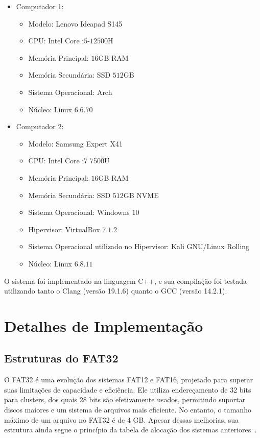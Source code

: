 \documentclass[
    12pt,				%
    oneside,   	        %
    a4paper,			%
    english,			%
    french,				%
    spanish,			%
    brazil,				%
    ]{pacotes/abntex2}
\begin{document}
\begin{itemize}
  \item Computador 1:
  \begin{itemize}
    \item Modelo: Lenovo Ideapad S145
    \item CPU: Intel Core i$5$-$12500$H
    \item Memória Principal: $16$GB RAM
    \item Memória Secundária: SSD $512$GB
    \item Sistema Operacional: Arch
  \item Núcleo: Linux $6.6.70$ 
  \end{itemize}
  \item Computador 2:
  \begin{itemize}
    \item Modelo: Samsung Expert X41
    \item CPU: Intel Core i7 7500U
    \item Memória Principal: $16$GB RAM
    \item Memória Secundária: SSD $512$GB NVME
    \item Sistema Operacional: Windowns $10$
    \item Hipervisor: VirtualBox $7.1.2$
    \item Sistema Operacional utilizado no Hipervisor: Kali GNU/Linux Rolling
    \item Núcleo: Linux $6.8.11$
  \end{itemize}
\end{itemize}

O sistema foi implementado na linguagem C++, e sua compilação foi testada utilizando tanto o Clang (versão 19.1.6) quanto o GCC (versão 14.2.1).

\section{Detalhes de Implementação}
\label{sec:implementacao}

\subsection{Estruturas do FAT32}
\label{subsec:estrutura_fat}

O FAT32 é uma evolução dos sistemas FAT12 e FAT16, projetado para superar suas limitações de capacidade e eficiência. Ele utiliza endereçamento de 32 bits para clusters, dos quais 28 bits são efetivamente usados, permitindo suportar discos maiores e um sistema de arquivos mais eficiente. No entanto, o tamanho máximo de um arquivo no FAT32 é de 4 GB. Apesar dessas melhorias, sua estrutura ainda segue o princípio da tabela de alocação dos sistemas anteriores~\cite{osdev}.
\end{document}
